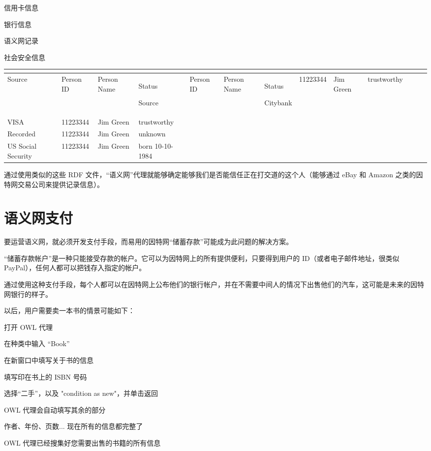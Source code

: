 \begin{compactitem}
\item 信用卡信息
\item 银行信息
\item 语义网记录
\item 社会安全信息
\end{compactitem}


\begin{longtable}{|p{90pt}|p{90pt}|p{90pt}|p{90pt}|}
\tabularnewline\hline
Source	&Person ID	&Person Name	&Status
\endhead

\hline
Source	&Person ID	&Person Name	&Status
\endfirsthead

\endfoot

\endlastfoot
\hline
Citybank			&11223344	&Jim Green	&trustworthy\\
\hline
VISA				&11223344	&Jim Green	&trustworthy\\
\hline
Recorded			&11223344	&Jim Green	&unknown\\
\hline
US Social Security	&11223344	&Jim Green	&born 10-10-1984\\
\hline

\end{longtable}

通过使用类似的这些 RDF 文件，“语义网”代理就能够确定能够我们是否能信任正在打交道的这个人（能够通过 eBay 和 Amazon 之类的因特网交易公司来提供记录信息）。

\section{语义网支付}



要运营语义网，就必须开发支付手段，而易用的因特网“储蓄存款”可能成为此问题的解决方案。

“储蓄存款帐户”是一种只能接受存款的帐户。它可以为因特网上的所有提供便利，只要得到用户的 ID（或者电子邮件地址，很类似 PayPal），任何人都可以把钱存入指定的帐户。

通过使用这种支付手段，每个人都可以在因特网上公布他们的银行帐户，并在不需要中间人的情况下出售他们的汽车，这可能是未来的因特网银行的样子。

以后，用户需要卖一本书的情景可能如下：

\begin{compactitem}
\item 打开 OWL 代理
\item 在种类中输入 “Book”
\item 在新窗口中填写关于书的信息
\item 填写印在书上的 ISBN 号码
\item 选择“二手”，以及 "condition as new"，并单击返回
\item OWL 代理会自动填写其余的部分
\item 作者、年份、页数... 现在所有的信息都完整了
\item OWL 代理已经搜集好您需要出售的书籍的所有信息
\end{compactitem}

